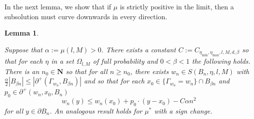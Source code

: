 \documentclass[12pt]{amsart}
\newcommand{\N}{\mathbf{N}}
\newtheorem{lemma}[theorem]{Lemma}
\begin{document}
In the next lemma, we show that if $\mu$ is strictly positive in the limit, then a subsolution must curve downwards in every direction. 


\begin{lemma}\label{strict-convexity}

Suppose that $\alpha := \mu(l,M) > 0$. There exists a constant $C := C_{\eta_{\min}, \eta_{\max}, l, M, d, \beta}$  so that for each $\eta$ in a set $\Omega_{l,M}$ of full probability and $0 < \beta < 1$ the following holds. There is an $n_0 \in \N$ %
so that for all $n \geq n_0$, there exists $w_n \in S(B_{n}, \eta, l, M)$ with $\frac{\alpha}{2} |B_{\beta n}| \leq |\partial^+(\Gamma_{w_n},B_{\beta n})|$ and so that for each $x_0 \in \{ \Gamma_{w_n} = w_n\} \cap B_{\beta n}$ and $p_0 \in \partial^+(w_n, x_0, B_n)$ %
\[
w_n(y) \leq w_n(x_0) + p_0 \cdot (y-x_0) - C \alpha n^2 %
\]
for all $y \in \partial B_{n}$. An analogous result holds for $\mu^*$ with a sign change. 


\end{lemma}
\end{document}
